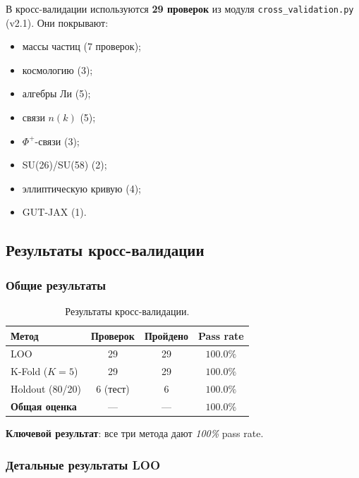\documentclass[11pt,a4paper]{article}
\theoremstyle{definition}
\begin{document}
В кросс-валидации используются \textbf{29 проверок} из
модуля \texttt{cross\_validation.py} (v2.1). Они покрывают:
\begin{itemize}
    \item массы частиц (7 проверок);
    \item космологию (3);
    \item алгебры Ли (5);
    \item связи $n(k)$ (5);
    \item $\Phi^+$-связи (3);
    \item SU(26)/SU(58) (2);
    \item эллиптическую кривую (4);
    \item GUT-JAX (1).
\end{itemize}

\subsection{Результаты кросс-валидации}
\label{subsec:cv-results}

\subsubsection{Общие результаты}

\begin{table}[ht]
\centering
\caption{Результаты кросс-валидации.}
\label{tab:cv-results-main}
\begin{tabular}{lccc}
\toprule
Метод & Проверок & Пройдено & Pass rate \\
\midrule
LOO      & 29 & 29 & $100.0\%$ \\
K-Fold ($K=5$) & 29 & 29 & $100.0\%$ \\
Holdout (80/20) & 6 (тест) & 6 & $100.0\%$ \\
\midrule
\textbf{Общая оценка} & --- & --- & $\mathbf{100.0\%}$ \\
\bottomrule
\end{tabular}
\end{table}

\medskip\noindent
\textbf{Ключевой результат}: все три метода дают
\emph{100\%} pass rate.

\subsubsection{Детальные результаты LOO}
\end{document}
